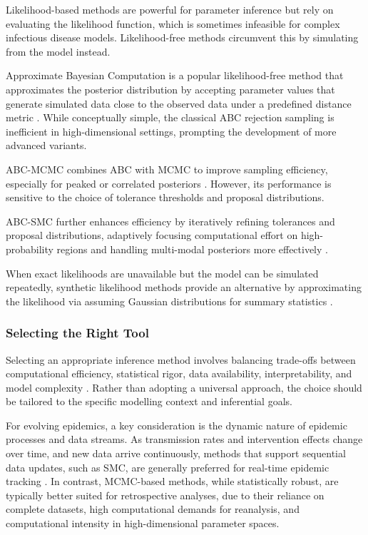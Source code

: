 \documentclass{article}
\begin{document}
Likelihood-based methods are powerful for parameter inference but rely on evaluating the likelihood function, which is sometimes infeasible for complex infectious disease models. Likelihood-free methods circumvent this by simulating from the model instead.

Approximate Bayesian Computation is a popular likelihood-free method that approximates the posterior distribution by accepting parameter values that generate simulated data close to the observed data under a predefined distance metric \citep{rubin1984bayesianly, tavare1997inferring, beaumont2002approximate}. While conceptually simple, the classical ABC rejection sampling is inefficient in high-dimensional settings, prompting the development of more advanced variants. 

ABC-MCMC combines ABC with MCMC to improve sampling efficiency, especially for peaked or correlated posteriors \citep{marjoram2003markov, wegmann2009efficient, kypraios2017tutorial}. However, its performance is sensitive to the choice of tolerance thresholds and proposal distributions.

ABC-SMC further enhances efficiency by iteratively refining  tolerances and proposal distributions, adaptively focusing computational effort on high-probability regions and handling multi-modal posteriors more effectively \citep{sisson2007sequential, toni2009approximate, beaumont2009adaptive, drovandi2011likelihood}. 

When exact likelihoods are unavailable but the model can be simulated repeatedly, synthetic likelihood methods provide an alternative by approximating the likelihood via assuming Gaussian distributions for summary statistics \citep{wood2010statistical, price2018bayesian}. 

\subsubsection{Selecting the Right Tool}

Selecting an appropriate inference method involves balancing trade-offs between computational efficiency, statistical rigor, data availability, interpretability, and model complexity \citep{funk2020choices}. Rather than adopting a universal approach, the choice should be tailored to the specific modelling context and inferential goals. 

For evolving epidemics, a key consideration is the dynamic nature of epidemic processes and data streams. As transmission rates and intervention effects change over time, and new data arrive continuously, methods that support sequential data updates, such as SMC, are generally preferred for real-time epidemic tracking \citep{birrell2020efficient, storvik2023sequential}. In contrast, MCMC-based methods, while statistically robust, are typically better suited for retrospective analyses, due to their reliance on complete datasets, high computational demands for reanalysis, and computational intensity in high-dimensional parameter spaces. 
\end{document}
